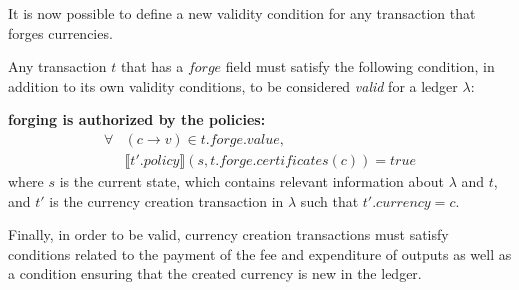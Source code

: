 \documentclass{llncs}
\newcommand{\field}[1]{\mathit{#1}}
\newcommand{\forge}{\field{forge}}
\newcommand{\val}{\field{value}}
\newcommand{\policy}{\field{policy}}
\newcommand{\certificates}{\field{certificates}}
\newcommand{\currency}{\field{currency}}
\newcommand{\true}{\field{true}}
\newcommand{\interpret}[1]{\llbracket #1 \rrbracket}
\newenvironment{smallish}{
	\begin{small}
}{
	\end{small}
}
\begin{document}
It is now possible to define a new validity condition for any transaction that forges currencies.

\begin{definition}
\label{def:Valid-Forge}
Any transaction $t$ that has a $\forge$ field must satisfy the following condition, in addition to its own validity conditions, to be considered \emph{valid} for a ledger $\lambda$:

\begin{smallish}
\textbf{forging is authorized by the policies:}
\begin{equation*}
\begin{split}
\forall &(c \rightarrow v) \in t.\forge.\val,\\& \interpret{t'.\policy}(s, t.\forge.\certificates(c)) = \true
\end{split}
\end{equation*}
where $s$ is the current state, which contains relevant information about $\lambda$ and $t$, and $t'$ is the currency creation transaction in $\lambda$ such that $t'.\currency = c$.
\end{smallish}
\end{definition}

Finally, in order to be valid, currency creation transactions must satisfy conditions related to the payment of the fee and expenditure of outputs as well as a condition ensuring that the created currency is new in the ledger.
\end{document}
